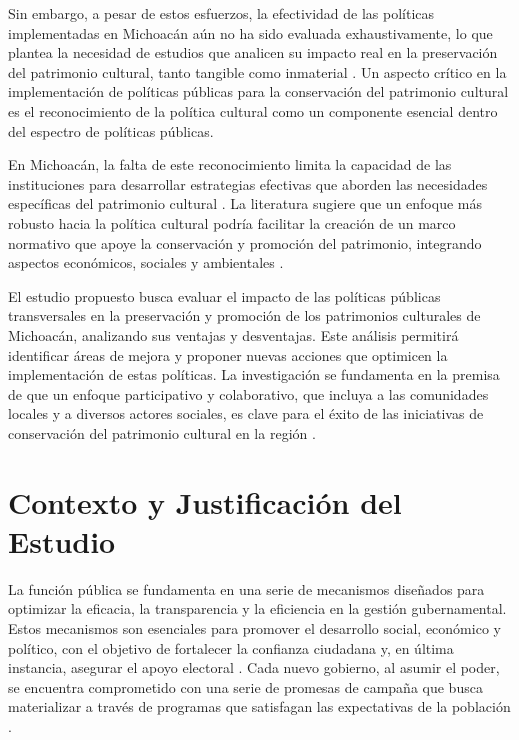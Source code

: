 \documentclass[
  spanish,
  11pt,
  a4paper,
]{scrbook}
\begin{document}
Sin embargo, a pesar de estos esfuerzos, la efectividad de las políticas
implementadas en Michoacán aún no ha sido evaluada exhaustivamente, lo
que plantea la necesidad de estudios que analicen su impacto real en la
preservación del patrimonio cultural, tanto tangible como inmaterial
\autocite{CabreraMartinez2023}. Un aspecto crítico en la implementación
de políticas públicas para la conservación del patrimonio cultural es el
reconocimiento de la política cultural como un componente esencial
dentro del espectro de políticas públicas.

En Michoacán, la falta de este reconocimiento limita la capacidad de las
instituciones para desarrollar estrategias efectivas que aborden las
necesidades específicas del patrimonio cultural \autocite{Fracasso2019}.
La literatura sugiere que un enfoque más robusto hacia la política
cultural podría facilitar la creación de un marco normativo que apoye la
conservación y promoción del patrimonio, integrando aspectos económicos,
sociales y ambientales \autocite{CollSerrano2013}.

El estudio propuesto busca evaluar el impacto de las políticas públicas
transversales en la preservación y promoción de los patrimonios
culturales de Michoacán, analizando sus ventajas y desventajas. Este
análisis permitirá identificar áreas de mejora y proponer nuevas
acciones que optimicen la implementación de estas políticas. La
investigación se fundamenta en la premisa de que un enfoque
participativo y colaborativo, que incluya a las comunidades locales y a
diversos actores sociales, es clave para el éxito de las iniciativas de
conservación del patrimonio cultural en la región
\autocite{Cantar2021,LlurdesCoit2021}.

\section*{Contexto y Justificación del
Estudio}\label{contexto-y-justificaciuxf3n-del-estudio}


La función pública se fundamenta en una serie de mecanismos diseñados
para optimizar la eficacia, la transparencia y la eficiencia en la
gestión gubernamental. Estos mecanismos son esenciales para promover el
desarrollo social, económico y político, con el objetivo de fortalecer
la confianza ciudadana y, en última instancia, asegurar el apoyo
electoral \autocite{Sartori2003}. Cada nuevo gobierno, al asumir el
poder, se encuentra comprometido con una serie de promesas de campaña
que busca materializar a través de programas que satisfagan las
expectativas de la población \autocite{Kingdon2003}.
\end{document}
